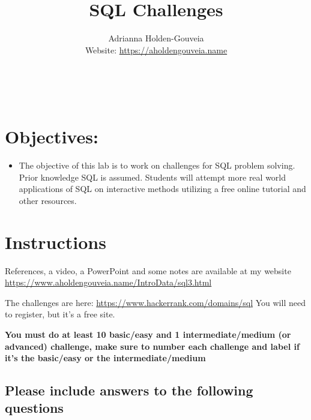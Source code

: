 \documentclass[12pt]{article}
\title{SQL Challenges}
\author{
        Adrianna Holden-Gouveia \\
        Website: \url{https://aholdengouveia.name}\\ 
        \date{\vspace{-5ex}}
        \faLinkedin{: aholdengouveia} \\
        \faGithub {: aholdengouveia} \\
        }
\begin{document}
    

\maketitle


\section*{Objectives:}
\begin{itemize}
    \item The objective of this lab is to work on challenges for SQL problem solving. Prior knowledge SQL is assumed. Students will attempt more real world applications of SQL on interactive methods utilizing a free online tutorial and other resources.
\end{itemize}
\section*{Instructions}

References, a video, a PowerPoint and some notes are available at my website
\url {https://www.aholdengouveia.name/IntroData/sql3.html}

The challenges are here: \url{https://www.hackerrank.com/domains/sql} You will need to register, but it's a free site. 


\textbf{You must do at least 10 basic/easy and 1 intermediate/medium (or advanced) challenge, make sure to number each challenge and label if it's the basic/easy or the intermediate/medium}

\subsection*{Please include answers to the following questions}
\end{document}
